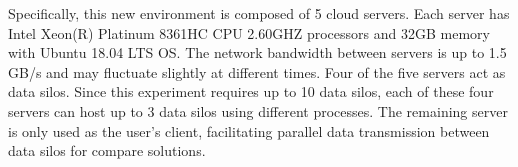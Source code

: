Specifically, this new environment is composed of 5 cloud servers. 
Each server has Intel Xeon(R) Platinum 8361HC CPU 2.60GHZ processors and 32GB memory with Ubuntu 18.04 LTS OS.
The network bandwidth between servers is up to 1.5 GB/s and may fluctuate slightly at different times.
Four of the five servers act as data silos. 
Since this experiment requires up to 10 data silos, each of these four servers can host up to 3 data silos using different processes.
The remaining server is only used as the user's client, facilitating parallel data transmission between data silos for compare solutions.


